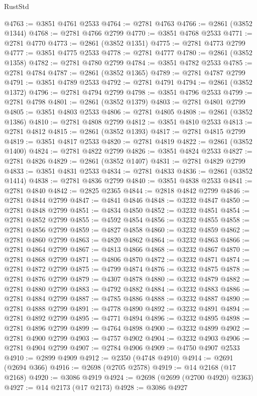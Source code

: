 \begin{lexlean}{RustStd}
\begin{coremodule}
@4763 := @3851 @4761 @2533
@4764 := @2781 @4763
@4766 := @2861 (@3852 @1344)
@4768 := @2781 @4766 @2799
@4770 := @3851 @4768 @2533
@4771 := @2781 @4770
@4773 := @2861 (@3852 @1351)
@4775 := @2781 @4773 @2799
@4777 := @3851 @4775 @2533
@4778 := @2781 @4777
@4780 := @2861 (@3852 @1358)
@4782 := @2781 @4780 @2799
@4784 := @3851 @4782 @2533
@4785 := @2781 @4784
@4787 := @2861 (@3852 @1365)
@4789 := @2781 @4787 @2799
@4791 := @3851 @4789 @2533
@4792 := @2781 @4791
@4794 := @2861 (@3852 @1372)
@4796 := @2781 @4794 @2799
@4798 := @3851 @4796 @2533
@4799 := @2781 @4798
@4801 := @2861 (@3852 @1379)
@4803 := @2781 @4801 @2799
@4805 := @3851 @4803 @2533
@4806 := @2781 @4805
@4808 := @2861 (@3852 @1386)
@4810 := @2781 @4808 @2799
@4812 := @3851 @4810 @2533
@4813 := @2781 @4812
@4815 := @2861 (@3852 @1393)
@4817 := @2781 @4815 @2799
@4819 := @3851 @4817 @2533
@4820 := @2781 @4819
@4822 := @2861 (@3852 @1400)
@4824 := @2781 @4822 @2799
@4826 := @3851 @4824 @2533
@4827 := @2781 @4826
@4829 := @2861 (@3852 @1407)
@4831 := @2781 @4829 @2799
@4833 := @3851 @4831 @2533
@4834 := @2781 @4833
@4836 := @2861 (@3852 @1414)
@4838 := @2781 @4836 @2799
@4840 := @3851 @4838 @2533
@4841 := @2781 @4840
@4842 := @2825 @2365
@4844 := @2818 @4842 @2799
@4846 := @2781 @4844 @2799
@4847 := @4841 @4846
@4848 := @3232 @4847
@4850 := @2781 @4848 @2799
@4851 := @4834 @4850
@4852 := @3232 @4851
@4854 := @2781 @4852 @2799
@4855 := @4592 @4854
@4856 := @3232 @4855
@4858 := @2781 @4856 @2799
@4859 := @4827 @4858
@4860 := @3232 @4859
@4862 := @2781 @4860 @2799
@4863 := @4820 @4862
@4864 := @3232 @4863
@4866 := @2781 @4864 @2799
@4867 := @4813 @4866
@4868 := @3232 @4867
@4870 := @2781 @4868 @2799
@4871 := @4806 @4870
@4872 := @3232 @4871
@4874 := @2781 @4872 @2799
@4875 := @4799 @4874
@4876 := @3232 @4875
@4878 := @2781 @4876 @2799
@4879 := @4307 @4878
@4880 := @3232 @4879
@4882 := @2781 @4880 @2799
@4883 := @4792 @4882
@4884 := @3232 @4883
@4886 := @2781 @4884 @2799
@4887 := @4785 @4886
@4888 := @3232 @4887
@4890 := @2781 @4888 @2799
@4891 := @4778 @4890
@4892 := @3232 @4891
@4894 := @2781 @4892 @2799
@4895 := @4771 @4894
@4896 := @3232 @4895
@4898 := @2781 @4896 @2799
@4899 := @4764 @4898
@4900 := @3232 @4899
@4902 := @2781 @4900 @2799
@4903 := @4757 @4902
@4904 := @3232 @4903
@4906 := @2781 @4904 @2799
@4907 := @2784 @4906
@4909 := @4750 @4907 @2533
@4910 := @2899 @4909
@4912 := @2350 (@4748 @4910)
@4914 := @2691 (@2694 @366)
@4916 := @2698 (@2705 @2578)
@4919 := @14 @2168 (@17 @2168)
@4920 := @3086 @4919
@4924 := @2698 (@2699 (@2700 @4920) @2363)
@4927 := @14 @2173 (@17 @2173)
@4928 := @3086 @4927

\end{coremodule}
\end{lexlean}

